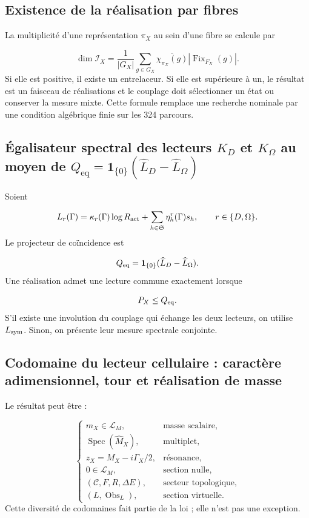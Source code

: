 \subsection{Existence de la réalisation par fibres}
La multiplicité d'une représentation \(\pi_X\) au sein d'une fibre se calcule par

\[
 \dim\mathscr I_X=
 \frac1{|G_X|}
 \sum_{g\in G_X}
 \overline{\chi_{\pi_X}(g)}
 |\operatorname{Fix}_{F_X}(g)|.
\]
Si elle est positive, il existe un entrelaceur. Si elle est supérieure à un, le résultat est un faisceau de réalisations et le couplage doit sélectionner un état ou conserver la mesure mixte. Cette formule remplace une recherche nominale par une condition algébrique finie sur les 324 parcours.

\subsection{Égalisateur spectral des lecteurs \(K_D\) et \(K_\Omega\) au moyen de \(Q_{\mathrm{eq}}=\mathbf1_{\{0\}}(\widehat L_D-\widehat L_\Omega)\)}
Soient

\[
 L_r(\Gamma)=
 \kappa_r(\Gamma)\log R_{\rm act}
 +\sum_{h\in\mathfrak S}\eta_h^r(\Gamma)s_h,
 \qquad r\in\{D,\Omega\}.
\]
Le projecteur de coïncidence est

\[
 Q_{\rm eq}=
 \mathbf1_{\{0\}}(\widehat L_D-\widehat L_\Omega).
\]
Une réalisation admet une lecture commune exactement lorsque

\[
 P_X\le Q_{\rm eq}.
\]
S'il existe une involution du couplage qui échange les deux lecteurs, on utilise \(L_{\rm sym}\). Sinon, on présente leur mesure spectrale conjointe.

\subsection{Codomaine du lecteur cellulaire : caractère adimensionnel, tour et réalisation de masse}
Le résultat peut être :

\[
 \begin{cases}
 m_X\in\mathcal L_M,&\text{masse scalaire},\\
 \operatorname{Spec}(\widehat M_X),&\text{multiplet},\\
 z_X=M_X-i\Gamma_X/2,&\text{résonance},\\
 0\in\mathcal L_M,&\text{section nulle},\\
 (\mathcal C,F,R,\Delta E),&\text{secteur topologique},\\
 (L,\operatorname{Obs}_L),&\text{section virtuelle}.
 \end{cases}
\]
Cette diversité de codomaines fait partie de la loi ; elle n'est pas une exception.

